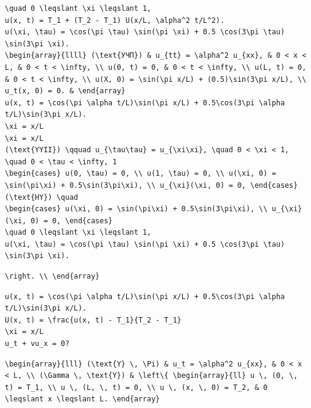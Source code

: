 \documentclass[
  ukrainian,
]{article}
\begin{document}
\begin{verbatim}
\quad 0 \leqslant \xi \leqslant 1,
u(x, t) = T_1 + (T_2 - T_1) U(x/L, \alpha^2 t/L^2).
u(\xi, \tau) = \cos(\pi \tau) \sin(\pi \xi) + 0.5 \cos(3\pi \tau) \sin(3\pi \xi).
\begin{array}{llll} (\text{УЧП}) & u_{tt} = \alpha^2 u_{xx}, & 0 < x < L, & 0 < t < \infty, \\ u(0, t) = 0, & 0 < t < \infty, \\ u(L, t) = 0, & 0 < t < \infty, \\ u(X, 0) = \sin(\pi x/L) + (0.5)\sin(3\pi x/L), \\ u_t(x, 0) = 0. & \end{array}
u(x, t) = \cos(\pi \alpha t/L)\sin(\pi x/L) + 0.5\cos(3\pi \alpha t/L)\sin(3\pi x/L).
\xi = x/L
\xi = x/L
(\text{YYII}) \qquad u_{\tau\tau} = u_{\xi\xi}, \quad 0 < \xi < 1, \quad 0 < \tau < \infty, 1
\begin{cases} u(0, \tau) = 0, \\ u(1, \tau) = 0, \\ u(\xi, 0) = \sin(\pi\xi) + 0.5\sin(3\pi\xi), \\ u_{\xi}(\xi, 0) = 0, \end{cases}
(\text{HY}) \quad
\begin{cases} u(\xi, 0) = \sin(\pi\xi) + 0.5\sin(3\pi\xi), \\ u_{\xi}(\xi, 0) = 0, \end{cases}
\quad 0 \leqslant \xi \leqslant 1,
u(\xi, \tau) = \cos(\pi \tau) \sin(\pi \xi) + 0.5 \cos(3\pi \tau) \sin(3\pi \xi).
\end{verbatim}

\begin{verbatim}
\right. \\ \end{array}
\end{verbatim}

\begin{verbatim}
u(x, t) = \cos(\pi \alpha t/L)\sin(\pi x/L) + 0.5\cos(3\pi \alpha t/L)\sin(3\pi x/L).
U(x, t) = \frac{u(x, t) - T_1}{T_2 - T_1}
\xi = x/L
u_t + vu_x = 0?
\end{verbatim}

\begin{verbatim}
\begin{array}{lll} (\text{Y} \, \Pi) & u_t = \alpha^2 u_{xx}, & 0 < x < L, \\ (\Gamma \, \text{Y}) & \left\{ \begin{array}{ll} u \, (0, \, t) = T_1, \\ u \, (L, \, t) = 0, \\ u \, (x, \, 0) = T_2, & 0 \leqslant x \leqslant L. \end{array}
\end{verbatim}
\end{document}
